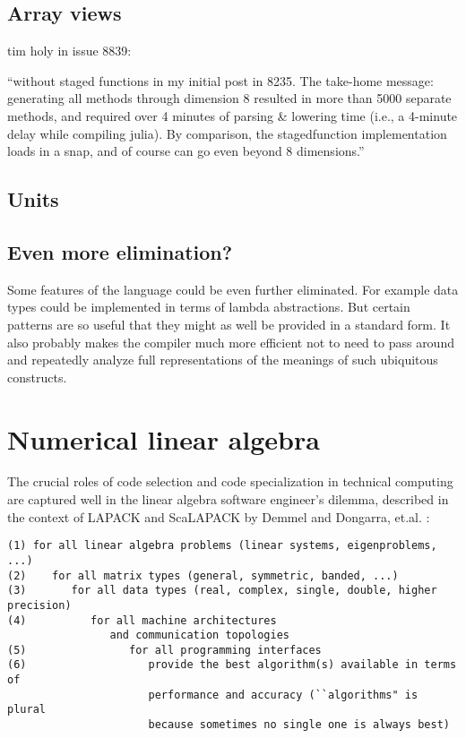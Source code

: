 
\subsection{Array views}

tim holy in issue 8839:

``without staged functions in my initial post in 8235. The take-home message: generating all methods through dimension 8 resulted in more than 5000 separate methods, and required over 4 minutes of parsing \& lowering time (i.e., a 4-minute delay while compiling julia). By comparison, the stagedfunction implementation loads in a snap, and of course can go even beyond 8 dimensions.''


\subsection{Units}


\subsection{Even more elimination?}

Some features of the language could be even further eliminated. For example data
types could be implemented in terms of lambda abstractions. But certain patterns
are so useful that they might as well be provided in a standard form. It also
probably makes the compiler much more efficient not to need to pass around and
repeatedly analyze full representations of the meanings of such ubiquitous constructs.


\section{Numerical linear algebra}
\label{sec:linalg}

The crucial roles of code selection and code specialization in technical
computing are captured well in the linear algebra software engineer's dilemma,
described in the context of LAPACK and ScaLAPACK by Demmel and Dongarra,
et.al. \cite{lawn181}:
\vspace{-3ex}
\begin{singlespace}
\begin{small}
\begin{verbatim}
(1) for all linear algebra problems (linear systems, eigenproblems, ...)
(2)    for all matrix types (general, symmetric, banded, ...)
(3)       for all data types (real, complex, single, double, higher precision)
(4)          for all machine architectures
                and communication topologies
(5)                for all programming interfaces
(6)                   provide the best algorithm(s) available in terms of
                      performance and accuracy (``algorithms" is plural
                      because sometimes no single one is always best)
\end{verbatim}
\end{small}
\end{singlespace}

